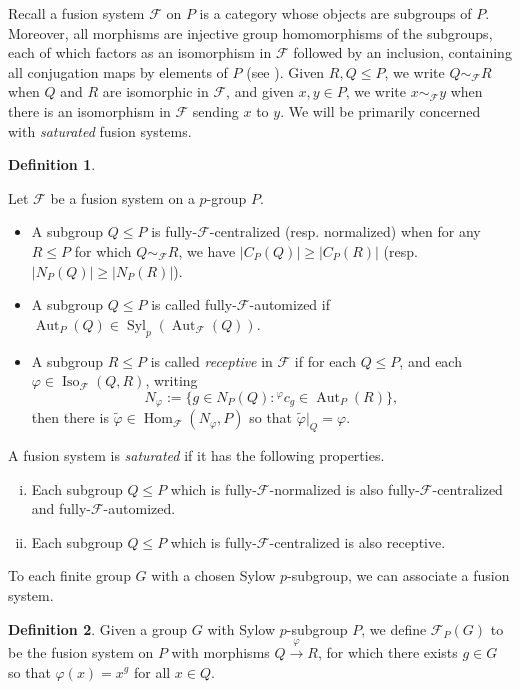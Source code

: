 \documentclass{amsart}
\theoremstyle{plain}\newtheorem{theorem}{Theorem}[section]
\theoremstyle{plain}\newtheorem{conjecture}[theorem]{Conjecture}
\theoremstyle{plain}\newtheorem{corollary}[theorem]{Corollary}
\theoremstyle{plain}\newtheorem{lemma}[theorem]{Lemma}
\theoremstyle{plain}\newtheorem{proposition}[theorem]{Proposition}
\theoremstyle{plain}\newtheorem{statement}[theorem]{}
\theoremstyle{definition}\newtheorem{definition}[theorem]{Definition}
\theoremstyle{definition}\newtheorem{example}[theorem]{Example}
\theoremstyle{definition}\newtheorem{examples}[theorem]{Examples}
\theoremstyle{definition}\newtheorem{notation}[theorem]{Notation}
\theoremstyle{definition}\newtheorem{remark}[theorem]{Remark}
\theoremstyle{definition}\newtheorem{remarks}[theorem]{Remarks}
\theoremstyle{definition}\newtheorem{question}[theorem]{Question}
\theoremstyle{definition}\newtheorem{propositiondefinition}[theorem]{Definition/Proposition}
\DeclareMathOperator{\Hom}{Hom}
\renewcommand{\phi}{\varphi}
\newcommand{\F}{\mathcal{F}}
\begin{document}
Recall a fusion system $\mathcal{F}$ on $P$ is a category whose objects are subgroups of $P$. Moreover, all morphisms are injective group homomorphisms of the subgroups, each of which factors as an isomorphism in $\mathcal{F}$ followed by an inclusion, containing all conjugation maps by elements of $P$ (see \cite{AKO}).  Given $R, Q \leq P$, we write $Q \sim_{\mathcal{F}} R$ when $Q$ and $R$ are isomorphic in $\mathcal{F}$, and given $x, y\in P$, we write $x \sim_\F y$ when there is an isomorphism in $\mathcal{F}$ sending $x$ to $y$. We will be primarily concerned with \emph{saturated} fusion systems.
\begin{definition}\cite[Part I, Definitions 2.2, 2.4 \& Proposition 2.5]{AKO}

Let $\mathcal{F}$ be a fusion system on a $p$-group $P$.
\begin{itemize}
\item A subgroup $Q \leq P$ is fully-$\mathcal{F}$-centralized (resp. normalized) when for any $R \leq P$ for which $Q \sim_\mathcal{F}R$, we have $|C_P(Q)|\geq|C_P(R)|$ (resp. $|N_P(Q)|\geq|N_P(R)|$).
\item A subgroup $Q \leq P$ is called fully-$\mathcal{F}$-automized if $\operatorname{Aut}_P(Q) \in \operatorname{Syl}_p(\operatorname{Aut}_\mathcal{F}(Q))$.
 \item A subgroup $R \leq P$ is called \emph{receptive} in $\mathcal{F}$ if for each $Q\leq P$, and each $\phi \in \operatorname{Iso}_\mathcal{F}(Q,R)$, writing
$$N_\phi := \{ g \in N_P(Q): \hspace{0pt}^\phi c_g \in \operatorname{Aut}_P(R) \},$$
then there is $\tilde\phi \in \Hom_\F(N_\phi, P)$ so that $\tilde\phi\big|_Q = \phi$. 
\end{itemize}
A fusion system is \emph{saturated} if it has the following properties.
\begin{enumerate}[(i)]
	\item Each subgroup $Q\leq P$ which is fully-$\F$-normalized is also fully-$\mathcal{F}$-centralized and fully-$\F$-automized.
	\item Each subgroup $Q \leq P$ which is fully-$\F$-centralized is also receptive.
\end{enumerate}
\end{definition}
To each finite group $G$ with a chosen Sylow $p$-subgroup, we can associate a fusion system.

\begin{definition}\cite[8.1.2]{linckelmann} Given a group $G$ with Sylow $p$-subgroup $P$, we define $\mathcal{F}_P(G)$ to be the fusion system on $P$ with morphisms $Q \xrightarrow\varphi R$, for which there exists $g\in G$ so that $\varphi(x) = x^g$ for all $x\in Q$.
\end{definition}
\end{document}
